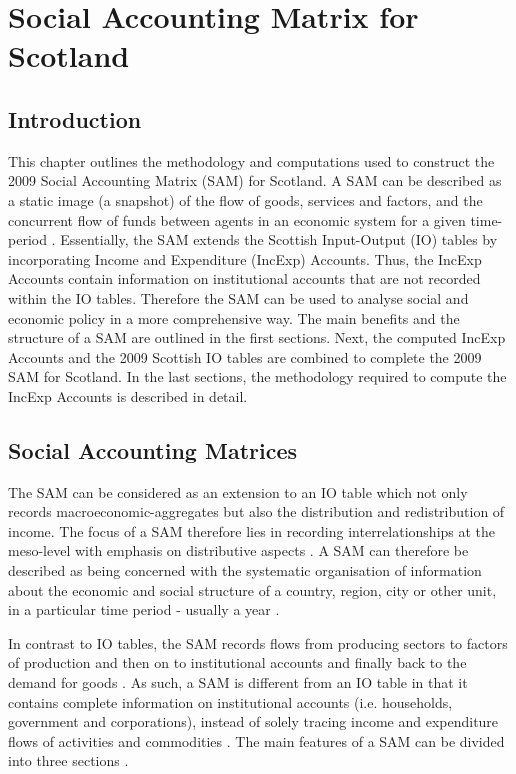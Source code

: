 \chapter{Social Accounting Matrix for Scotland}
\label{Chapter2}

\section{Introduction} 
\label{sec:2.1}

This chapter outlines the methodology and computations used to construct the 2009 Social Accounting Matrix (SAM) for Scotland. A SAM can be described as a static image (a snapshot) of the flow of goods, services and factors, and the concurrent flow of funds between agents in an economic system for a given time-period . Essentially, the SAM extends the Scottish Input-Output (IO) tables by incorporating Income and Expenditure (IncExp) Accounts. Thus, the IncExp Accounts contain information on institutional accounts that are not recorded within the IO tables. Therefore the SAM can be used to analyse social and economic policy in a more comprehensive way. The main benefits and the structure of a SAM are outlined in the first sections.  Next, the computed IncExp Accounts and the 2009 Scottish IO tables are combined to complete the 2009 SAM for Scotland. In the last sections, the methodology required to compute the IncExp Accounts is described in detail.

\newpage
\section{Social Accounting Matrices} 
\label{sec:2.2}

The SAM can be considered as an extension to an IO table which not only records macroeconomic-aggregates but also the distribution and redistribution of income. The focus of a SAM therefore lies in recording interrelationships at the meso-level with emphasis on distributive aspects \cite{Keuning1988a}. A SAM can therefore be described as being concerned with the systematic organisation of information about the economic and social structure of a country, region, city or other unit, in a particular time period - usually a year \cite{King1981a}.

\bigskip

In contrast to IO tables, the SAM records flows from producing sectors to factors of production and then on to institutional accounts and finally back to the demand for goods \cite{Adelman1986a}. As such, a SAM is different from an IO table in that it contains complete information on institutional accounts (i.e. households, government and corporations), instead of solely tracing income and expenditure flows of activities and commodities . The main features of a SAM can be divided into three sections \cite{Round2003a}.   

